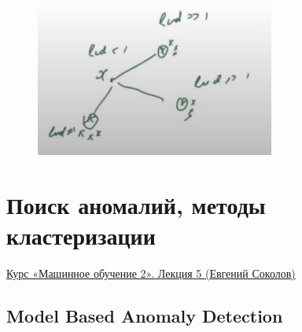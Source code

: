 \begin{enumerate}
\begin{enumerate}
\begin{itemize}
\begin{itemize}
\begin{itemize}
\begin{definition}
                                    \begin{figure}[H]
                                        \centering
                                        \includegraphics[width=0.7\textwidth]{images/18lecture/LOF.png}
                                    \end{figure}
                                \end{definition}
                            \end{itemize}
                         \end{itemize}
                     \end{itemize}
                 \end{enumerate}
        \end{enumerate}
        


\newpage
\section{Поиск аномалий, методы кластеризации}

    \href{https://www.youtube.com/watch?v=Al5MQJTKank&list=PLEqoHzpnmTfAVdVl2fH_je2_jWCEPAAqv&index=5}{Курс «Машинное обучение 2». Лекция 5 (Евгений Соколов)}

    \subsection{Model Based Anomaly Detection}

